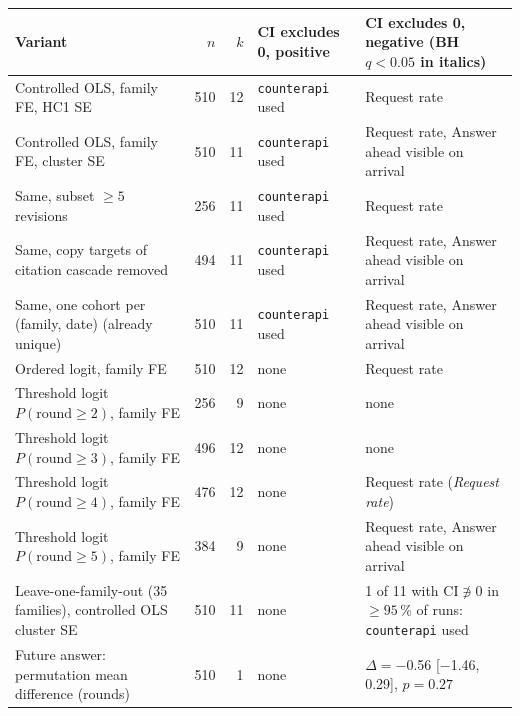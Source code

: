 \begin{tabular}{p{7.2cm}rrp{3.2cm}p{3.6cm}}
\toprule
Variant & $n$ & $k$ & CI excludes 0, positive & CI excludes 0, negative (BH $q<0.05$ in italics) \\
\midrule
Controlled OLS, family FE, HC1 SE & 510 & 12 & \texttt{counterapi} used & Request rate \\
Controlled OLS, family FE, cluster SE & 510 & 11 & \texttt{counterapi} used & Request rate, Answer ahead visible on arrival \\
Same, subset $\geq 5$ revisions & 256 & 11 & \texttt{counterapi} used & Request rate \\
Same, copy targets of citation cascade removed & 494 & 11 & \texttt{counterapi} used & Request rate, Answer ahead visible on arrival \\
Same, one cohort per (family, date) (already unique) & 510 & 11 & \texttt{counterapi} used & Request rate, Answer ahead visible on arrival \\
Ordered logit, family FE & 510 & 12 & none & Request rate \\
Threshold logit $P(\text{round}\geq 2)$, family FE & 256 & 9 & none & none \\
Threshold logit $P(\text{round}\geq 3)$, family FE & 496 & 12 & none & none \\
Threshold logit $P(\text{round}\geq 4)$, family FE & 476 & 12 & none & Request rate (\emph{Request rate}) \\
Threshold logit $P(\text{round}\geq 5)$, family FE & 384 & 9 & none & Request rate, Answer ahead visible on arrival \\
Leave-one-family-out (35 families), controlled OLS cluster SE & 510 & 11 & none & 1 of 11 with CI$\not\ni$0 in $\geq 95\,\%$ of runs: \texttt{counterapi} used \\
Future answer: permutation mean difference (rounds) & 510 & 1 & none & $\Delta=$\num{-0.56} [\num{-1.46}, \num{0.29}], $p=0.27$ \\
\bottomrule
\end{tabular}
